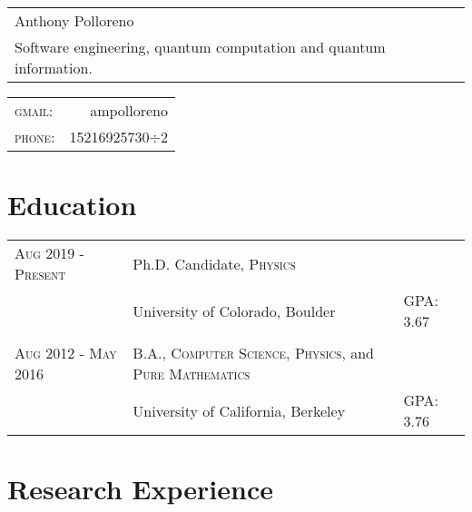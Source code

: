 \documentclass[a4paper,10pt]{article}
\begin{document}
\newcommand*{\fontin}[2]{{\setmainfont{Fontin}#1{#2}}}

\pagestyle{empty} %




\begin{tabular}{p{2.6in}}
{\Huge Anthony Polloreno}\\
Software engineering, quantum computation and quantum information.\\
\end{tabular}
\hfill
\begin{tabular}{lr}
    \fontin{\textsc}{gmail:}     & ampolloreno\\
    \fontin{\textsc}{phone:}     & 15216925730$\div$2
    \end{tabular}

\section{Education}
\begin{tabular}{l|ll}
  \fontin{\textsc}{Aug 2019 - Present} & Ph.D. Candidate, \fontin{\textsc}{Physics} \\ &University of Colorado, Boulder & GPA: 3.67 \\ \\
  \fontin{\textsc}{Aug 2012 - May 2016} & B.A., \fontin{\textsc}{Computer Science}, \fontin{\textsc}{Physics}, and \fontin{\textsc}{Pure Mathematics} \\ &University of California, Berkeley & GPA: 3.76 \\
\end{tabular}

\section{Research Experience}
\end{document}
